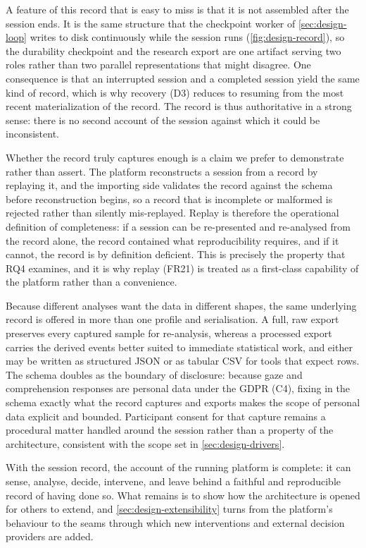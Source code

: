 A feature of this record that is easy to miss is that it is not assembled after the session ends.
It is the same structure that the checkpoint worker of \cref{sec:design-loop} writes to disk continuously while the session runs (\cref{fig:design-record}), so the durability checkpoint and the research export are one artifact serving two roles rather than two parallel representations that might disagree.
One consequence is that an interrupted session and a completed session yield the same kind of record, which is why recovery (D3) reduces to resuming from the most recent materialization of the record.
The record is thus authoritative in a strong sense: there is no second account of the session against which it could be inconsistent.

Whether the record truly captures enough is a claim we prefer to demonstrate rather than assert.
The platform reconstructs a session from a record by replaying it, and the importing side validates the record against the schema before reconstruction begins, so a record that is incomplete or malformed is rejected rather than silently mis-replayed.
Replay is therefore the operational definition of completeness: if a session can be re-presented and re-analysed from the record alone, the record contained what reproducibility requires, and if it cannot, the record is by definition deficient.
This is precisely the property that RQ4 examines, and it is why replay (FR21) is treated as a first-class capability of the platform rather than a convenience.

Because different analyses want the data in different shapes, the same underlying record is offered in more than one profile and serialisation.
A full, raw export preserves every captured sample for re-analysis, whereas a processed export carries the derived events better suited to immediate statistical work, and either may be written as structured JSON or as tabular CSV for tools that expect rows.
The schema doubles as the boundary of disclosure: because gaze and comprehension responses are personal data under the GDPR (C4), fixing in the schema exactly what the record captures and exports makes the scope of personal data explicit and bounded.
Participant consent for that capture remains a procedural matter handled around the session rather than a property of the architecture, consistent with the scope set in \cref{sec:design-drivers}.

With the session record, the account of the running platform is complete: it can sense, analyse, decide, intervene, and leave behind a faithful and reproducible record of having done so.
What remains is to show how the architecture is opened for others to extend, and \cref{sec:design-extensibility} turns from the platform's behaviour to the seams through which new interventions and external decision providers are added.
